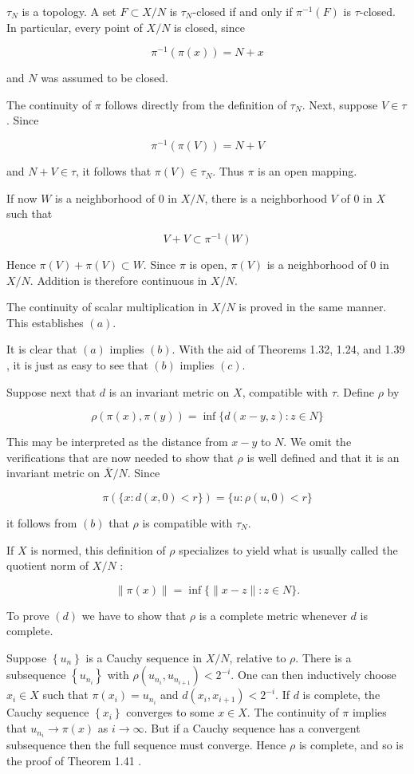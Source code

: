 \documentclass[10pt]{article}
\begin{document}
$\tau_{N}$ is a topology. A set $F \subset X / N$ is $\tau_{N}$-closed if and only if $\pi^{-1}(F)$ is $\tau$-closed. In particular, every point of $X / N$ is closed, since

$$
\pi^{-1}(\pi(x))=N+x
$$

and $N$ was assumed to be closed.

The continuity of $\pi$ follows directly from the definition of $\tau_{N}$. Next, suppose $V \in \tau$. Since

$$
\pi^{-1}(\pi(V))=N+V
$$

and $N+V \in \tau$, it follows that $\pi(V) \in \tau_{N}$. Thus $\pi$ is an open mapping.

If now $W$ is a neighborhood of 0 in $X / N$, there is a neighborhood $V$ of 0 in $X$ such that

$$
V+V \subset \pi^{-1}(W)
$$

Hence $\pi(V)+\pi(V) \subset W$. Since $\pi$ is open, $\pi(V)$ is a neighborhood of 0 in $X / N$. Addition is therefore continuous in $X / N$.

The continuity of scalar multiplication in $X / N$ is proved in the same manner. This establishes $(a)$.

It is clear that $(a)$ implies $(b)$. With the aid of Theorems 1.32, 1.24, and 1.39 , it is just as easy to see that $(b)$ implies $(c)$.

Suppose next that $d$ is an invariant metric on $X$, compatible with $\tau$. Define $\rho$ by

$$
\rho(\pi(x), \pi(y))=\inf \{d(x-y, z): z \in N\}
$$

This may be interpreted as the distance from $x-y$ to $N$. We omit the verifications that are now needed to show that $\rho$ is well defined and that it is an invariant metric on $\bar{X} / N$. Since

$$
\pi(\{x: d(x, 0)<r\})=\{u: \rho(u, 0)<r\}
$$

it follows from $(b)$ that $\rho$ is compatible with $\tau_{N}$.

If $X$ is normed, this definition of $\rho$ specializes to yield what is usually called the quotient norm of $X / N$ :

$$
\|\pi(x)\|=\inf \{\|x-z\|: z \in N\} .
$$

To prove $(d)$ we have to show that $\rho$ is a complete metric whenever $d$ is complete.

Suppose $\left\{u_{n}\right\}$ is a Cauchy sequence in $X / N$, relative to $\rho$. There is a subsequence $\left\{u_{n_{i}}\right\}$ with $\rho\left(u_{n_{i}}, u_{n_{i+1}}\right)<2^{-i}$. One can then inductively choose $x_{i} \in X$ such that $\pi\left(x_{i}\right)=u_{n_{i}}$ and $d\left(x_{i}, x_{i+1}\right)<2^{-i}$. If $d$ is complete, the Cauchy sequence $\left\{x_{i}\right\}$ converges to some $x \in X$. The continuity of $\pi$ implies that $u_{n_{i}} \rightarrow \pi(x)$ as $i \rightarrow \infty$. But if a Cauchy sequence has a convergent subsequence then the full sequence must converge. Hence $\rho$ is complete, and so is the proof of Theorem 1.41 .
\end{document}
